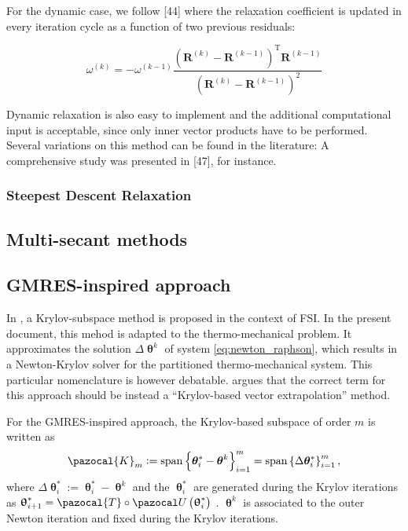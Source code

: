 For the dynamic case, we follow [44] where the relaxation coefficient is updated in every iteration cycle as a function of two previous residuals:

$$
\omega^{(k)}=-\omega^{(k-1)} \frac{\left(\mathbf{R}^{(k)}-\mathbf{R}^{(k-1)}\right)^{\mathrm{T}} \mathbf{R}^{(k-1)}}{\left(\mathbf{R}^{(k)}-\mathbf{R}^{(k-1)}\right)^{2}}
$$

Dynamic relaxation is also easy to implement and the additional computational input is acceptable, since only inner vector products have to be performed. Several variations on this method can be found in the literature: A comprehensive study was presented in [47], for instance.

\subsubsection{Steepest Descent Relaxation}

\subsection{Multi-secant methods}

\subsection{GMRES-inspired approach}

In \cite{michler_interface_2005}, a Krylov-subspace method is proposed in the context of FSI.
In the present document, this mehod is adapted to the thermo-mechanical problem.
It approximates the solution $\Delta \bm{\uptheta}^{k}$ of system \eqref{eq:newton_raphson}, which results in a Newton-Krylov solver for the partitioned thermo-mechanical system.
This particular nomenclature is however debatable.
\cite{kuttler_vector_2009} argues that the correct term for this approach should be instead a “Krylov-based vector extrapolation” method. 


For the GMRES-inspired approach, the Krylov-based subspace of order $m$ is written as
\begin{equation}
\pazocal{K}_{m}:=\operatorname{span}\left\{\boldsymbol{\theta}^{*}_i-\boldsymbol{\theta}^{k}\right\}_{i=1}^{m}=\operatorname{span}\left\{\Delta \boldsymbol{\theta}^*_{i}\right\}_{i=1}^{m},
\end{equation}
where $\Delta \bm{\uptheta}^*_{i}:=\bm{\uptheta}^*_{i}-\bm{\uptheta}^{k}$ and the $\bm{\uptheta}^*_{i}$ are generated during the Krylov iterations as $\bm{\uptheta}^*_{i+1}=\pazocal{T} \circ \pazocal U\left(\bm{\uptheta}^*_{i}\right)$ . $\bm{\uptheta}^{k}$ is associated to the outer Newton iteration and fixed during the Krylov iterations.

